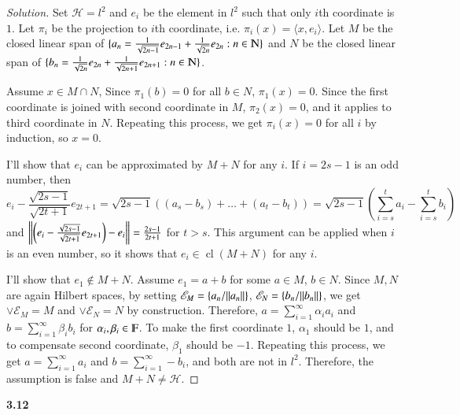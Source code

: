 \documentclass[a4paper, 12pt]{article}
\theoremstyle{Mydefinition}
\theoremstyle{Mytheorem}
\DeclareMathOperator{\cl}{cl}
\begin{document}
\begin{proof}[Solution]
Set $\mathscr{H} = l^2$ and $e_i$ be the element in $l^2$ such that only $i$th coordinate is $1$. Let $\pi_i$ be the projection to $i$th coordinate, i.e. $\pi_i(x) = \langle x, e_i\rangle$. Let $M$ be the closed linear span of $\{a_n = \frac{1}{\sqrt{2n-1}}e_{2n-1}+\frac{1}{\sqrt{2n}}e_{2n}:n\in\varmathbb{N}\}$ and $N$ be the closed linear span of $\{b_n = \frac{1}{\sqrt{2n}}e_{2n}+\frac{1}{\sqrt{2n+1}}e_{2n + 1}:n\in\varmathbb{N}\}$.

Assume $x\in M\cap N$, Since $\pi_1(b) = 0$ for all $b\in N$, $\pi_1(x) = 0$. Since the first coordinate is joined with second coordinate in $M$, $\pi_2(x)=0$, and it applies to third coordinate in $N$. Repeating this process, we get $\pi_i(x)=0$ for all $i$ by induction, so $x = 0$.

I'll show that $e_i$ can be approximated by $M+N$ for any $i$. If $i = 2s-1$ is an odd number, then
\begin{equation}
    e_i -\frac{\sqrt{2s-1}}{\sqrt{2t+1}}e_{2t+1}= \sqrt{2s-1}((a_s -b_s) + \ldots + (a_t - b_t)) = \sqrt{2s-1}(\sum_{i=s}^t a_i - \sum_{i=s}^t b_i)
\end{equation}
and $\norm{\left(e_i - \frac{\sqrt{2s-1}}{\sqrt{2t+1}}e_{2t+1}\right) - e_i} = \frac{2s-1}{2t+1}$ for $t>s$. This argument can be applied when $i$ is an even number, so it shows that $e_i\in \cl(M+N)$ for any $i$.

I'll show that $e_1\notin M+N$. Assume $e_1 = a+b$ for some $a\in M$, $b\in N$. Since $M, N$ are again Hilbert spaces, by setting $\mathscr{E}_M = \{a_n/\norm{a_n}\}$, $\mathscr{E}_N = \{b_n/\norm{b_n}\}$, we get $\vee \mathscr{E}_M = M$ and $\vee \mathscr{E}_N = N$ by construction. Therefore, $a = \sum_{i=1}^\infty \alpha_i a_i$ and $b = \sum_{i=1}^\infty \beta_i b_i$ for $\alpha_i,\beta_i\in \varmathbb{F}$. To make the first coordinate $1$, $\alpha_1$ should be $1$, and to compensate second coordinate, $\beta_1$ should be $-1$. Repeating this process, we get $a = \sum_{i=1}^\infty a_i$ and $b = \sum_{i=1}^\infty -b_i$, and both are not in $l^2$. Therefore, the assumption is false and $M+N\neq \mathscr{H}$.
\end{proof}


\noindent \textbf{3.12}
\end{document}
